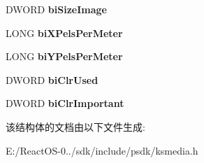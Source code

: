 \begin{DoxyCompactItemize}
D\+W\+O\+RD {\bfseries bi\+Size\+Image}
\item 
\mbox{\label{structtag_k_s___b_i_t_m_a_p_i_n_f_o_h_e_a_d_e_r_ad4030afda7ee0f687c5c4775d344383d}} 
L\+O\+NG {\bfseries bi\+X\+Pels\+Per\+Meter}
\item 
\mbox{\label{structtag_k_s___b_i_t_m_a_p_i_n_f_o_h_e_a_d_e_r_a54cd17798f1bcb0dc1e378dc963c8a65}} 
L\+O\+NG {\bfseries bi\+Y\+Pels\+Per\+Meter}
\item 
\mbox{\label{structtag_k_s___b_i_t_m_a_p_i_n_f_o_h_e_a_d_e_r_a64a62cdcf6133ea050330f58e120ec42}} 
D\+W\+O\+RD {\bfseries bi\+Clr\+Used}
\item 
\mbox{\label{structtag_k_s___b_i_t_m_a_p_i_n_f_o_h_e_a_d_e_r_a477498ba555b81f5123fd2bad7e81047}} 
D\+W\+O\+RD {\bfseries bi\+Clr\+Important}
\end{DoxyCompactItemize}


该结构体的文档由以下文件生成\+:\begin{DoxyCompactItemize}
\item 
E\+:/\+React\+O\+S-\/0../sdk/include/psdk/ksmedia.\+h\end{DoxyCompactItemize}

